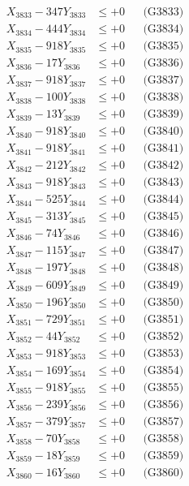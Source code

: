 \documentclass[a4paper,10pt]{article}
\begin{document}
{\begin{align}
X_{3833} - 347Y_{3833} &\leq +0 && \text{(G3833)} \\
X_{3834} - 444Y_{3834} &\leq +0 && \text{(G3834)} \\
X_{3835} - 918Y_{3835} &\leq +0 && \text{(G3835)} \\
X_{3836} - 17Y_{3836} &\leq +0 && \text{(G3836)} \\
X_{3837} - 918Y_{3837} &\leq +0 && \text{(G3837)} \\
X_{3838} - 100Y_{3838} &\leq +0 && \text{(G3838)} \\
X_{3839} - 13Y_{3839} &\leq +0 && \text{(G3839)} \\
X_{3840} - 918Y_{3840} &\leq +0 && \text{(G3840)} \\
\allowbreak
X_{3841} - 918Y_{3841} &\leq +0 && \text{(G3841)} \\
X_{3842} - 212Y_{3842} &\leq +0 && \text{(G3842)} \\
X_{3843} - 918Y_{3843} &\leq +0 && \text{(G3843)} \\
X_{3844} - 525Y_{3844} &\leq +0 && \text{(G3844)} \\
X_{3845} - 313Y_{3845} &\leq +0 && \text{(G3845)} \\
X_{3846} - 74Y_{3846} &\leq +0 && \text{(G3846)} \\
X_{3847} - 115Y_{3847} &\leq +0 && \text{(G3847)} \\
X_{3848} - 197Y_{3848} &\leq +0 && \text{(G3848)} \\
X_{3849} - 609Y_{3849} &\leq +0 && \text{(G3849)} \\
X_{3850} - 196Y_{3850} &\leq +0 && \text{(G3850)} \\
\allowbreak
X_{3851} - 729Y_{3851} &\leq +0 && \text{(G3851)} \\
X_{3852} - 44Y_{3852} &\leq +0 && \text{(G3852)} \\
X_{3853} - 918Y_{3853} &\leq +0 && \text{(G3853)} \\
X_{3854} - 169Y_{3854} &\leq +0 && \text{(G3854)} \\
X_{3855} - 918Y_{3855} &\leq +0 && \text{(G3855)} \\
X_{3856} - 239Y_{3856} &\leq +0 && \text{(G3856)} \\
X_{3857} - 379Y_{3857} &\leq +0 && \text{(G3857)} \\
X_{3858} - 70Y_{3858} &\leq +0 && \text{(G3858)} \\
X_{3859} - 18Y_{3859} &\leq +0 && \text{(G3859)} \\
X_{3860} - 16Y_{3860} &\leq +0 && \text{(G3860)} \\

\end{align}}
\end{document}
